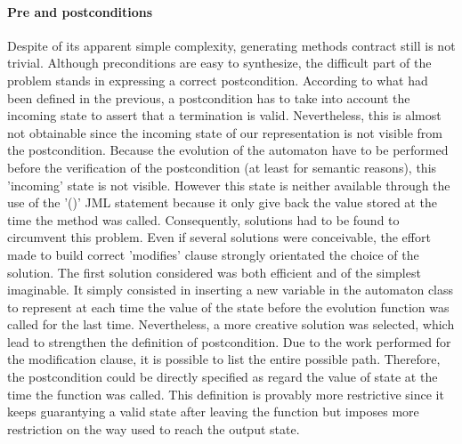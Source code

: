 \paragraph{Pre and postconditions}
Despite of its apparent simple complexity, generating methods contract still is not trivial. Although preconditions are easy to synthesize, the difficult part of the problem stands in expressing a correct postcondition. According to what had been defined in the previous, a postcondition has to take into account the incoming state to assert that a termination is valid. Nevertheless, this is almost not obtainable since the incoming state of our representation is not visible from the postcondition. Because the evolution of the automaton have to be performed before the verification of the postcondition (at least for semantic reasons), this 'incoming' state is not visible. However this state is neither available through the use of the '\old()' JML statement because it only give back the value stored at the time the method was called. Consequently, solutions had to be found to circumvent this problem.
Even if several solutions were conceivable, the effort made to build correct 'modifies' clause strongly orientated the choice of the solution. The first solution considered was both efficient and of the simplest imaginable. It simply consisted in inserting a new variable in the automaton class to represent at each time the value of the state before the evolution function was called for the last time. Nevertheless, a more creative solution was selected, which lead to strengthen the definition of postcondition. Due to the work performed for the modification clause, it is possible to list the entire possible path. Therefore, the postcondition could be directly specified as regard the value of state at the time the function was called. This definition is provably more restrictive since it keeps guarantying a valid state after leaving the function but imposes more restriction on the way used to reach the output state. 

